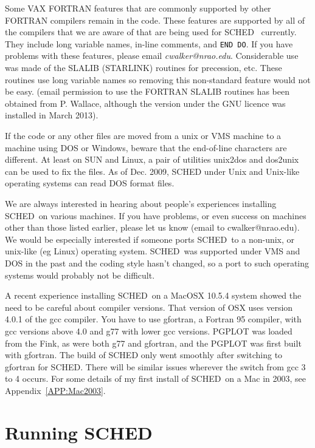 \documentclass{report}
\newcommand{\sched}{{\sc SCHED}}
\newcommand{\schedb}{{\sc SCHED~}}
\begin{document}
\begin{description}
\end{description}

Some VAX FORTRAN features that are commonly supported by other FORTRAN
compilers remain in the code.  These features are supported by all of
the compilers that we are aware of that are being used for \schedb
currently.  They include long variable names, in-line comments, and
{\tt END DO}.  If you have problems with these features, please email
{\sl cwalker@nrao.edu}.  Considerable use was made of the SLALIB
(STARLINK) routines for precession, etc.  These routines use long
variable names so removing this non-standard feature would not be
easy.  (email permission to use the FORTRAN SLALIB routines has been
obtained from P. Wallace, although the version under the GNU licence
was installed in March 2013).

If the code or any other files are moved from a unix or VMS machine to
a machine using DOS or Windows, beware that the end-of-line characters
are different.  At least on SUN and Linux, a pair of utilities
unix2dos and dos2unix can be used to fix the files.  As of Dec. 2009,
SCHED under Unix and Unix-like operating systems can read DOS format
files.

We are always interested in hearing about people's experiences
installing \schedb on various machines.  If you have problems, or even
success on machines other than those listed earlier, please let us
know (email to cwalker@nrao.edu).  We would be especially interested
if someone ports \schedb to a non-unix, or unix-like (eg Linux)
operating system.  \schedb was supported under VMS and DOS in the
past and the coding style hasn't changed, so a port to such operating
systems would probably not be difficult.

A recent experience installing \schedb on a MacOSX 10.5.4 system
showed the need to be careful about compiler versions.  That version
of OSX uses version 4.0.1 of the gcc compiler.  You have to use
gfortran, a Fortran 95 compiler, with gcc versions above 4.0 and g77
with lower gcc versions.  PGPLOT was loaded from the Fink, as were
both g77 and gfortran, and the PGPLOT was first built with gfortran.
The build of SCHED only went smoothly after switching to gfortran for
\sched.  There will be similar issues wherever the switch from gcc 3
to 4 occurs.  For some details of my first install of \schedb on a Mac
in 2003, see Appendix~\ref{APP:Mac2003}.


\section{\label{SEC:RUNSCHED}Running SCHED}
\end{document}
